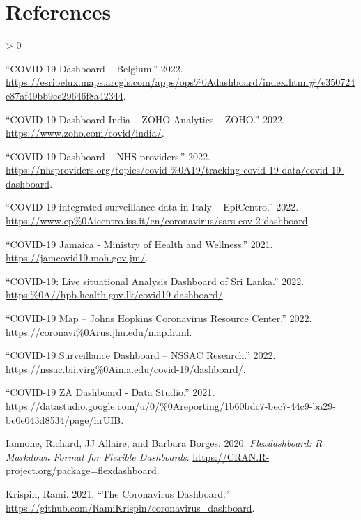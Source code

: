 \documentclass[
]{article}
\newlength{\cslhangindent}
\newenvironment{CSLReferences}[2] %
 {%
  \setlength{\parindent}{0pt}
  \ifodd #1 \everypar{\setlength{\hangindent}{\cslhangindent}}\ignorespaces\fi
  \ifnum #2 > 0
  \setlength{\parskip}{#2\baselineskip}
  \fi
 }%
 {}
\begin{document}
\hypertarget{references}{%
\section{References}\label{references}}

\hypertarget{refs}{}
\begin{CSLReferences}{1}{0}
\leavevmode\hypertarget{ref-belgium}{}%
{``{COVID 19 Dashboard -- Belgium}.''} 2022.
\url{https://esribelux.maps.arcgis.com/apps/ops\%0Adashboard/index.html\#/e350724c87af49bb9ce29646f8a42344}.

\leavevmode\hypertarget{ref-indiadash}{}%
{``{COVID 19 Dashboard India -- ZOHO Analytics -- ZOHO}.''} 2022.
\url{https://www.zoho.com/covid/india/}.

\leavevmode\hypertarget{ref-nhs}{}%
{``{COVID 19 Dashboard -- NHS providers}.''} 2022.
\url{https://nhsproviders.org/topics/covid-\%0A19/tracking-covid-19-data/covid-19-dashboard}.

\leavevmode\hypertarget{ref-italy}{}%
{``{COVID-19 integrated surveillance data in Italy -- EpiCentro}.''}
2022.
\url{https://www.ep\%0Aicentro.iss.it/en/coronavirus/sars-cov-2-dashboard}.

\leavevmode\hypertarget{ref-jamaica}{}%
{``{COVID-19 Jamaica - Ministry of Health and Wellness}.''} 2021.
\url{https://jamcovid19.moh.gov.jm/}.

\leavevmode\hypertarget{ref-sl}{}%
{``{COVID-19: Live situational Analysis Dashboard of Sri Lanka}.''}
2022. \url{https:\%0A//hpb.health.gov.lk/covid19-dashboard/}.

\leavevmode\hypertarget{ref-jh}{}%
{``{COVID-19 Map -- Johns Hopkins Coronavirus Resource Center}.''} 2022.
\url{https://coronavi\%0Arus.jhu.edu/map.html}.

\leavevmode\hypertarget{ref-nssac}{}%
{``{COVID-19 Surveillance Dashboard -- NSSAC Research}.''} 2022.
\url{https://nssac.bii.virg\%0Ainia.edu/covid-19/dashboard/}.

\leavevmode\hypertarget{ref-za}{}%
{``{COVID-19 ZA Dashboard - Data Studio}.''} 2021.
\url{https://datastudio.google.com/u/0/\%0Areporting/1b60bdc7-bec7-44c9-ba29-be0e043d8534/page/hrUIB}.

\leavevmode\hypertarget{ref-flexdashboard}{}%
Iannone, Richard, JJ Allaire, and Barbara Borges. 2020.
\emph{Flexdashboard: R Markdown Format for Flexible Dashboards}.
\url{https://CRAN.R-project.org/package=flexdashboard}.

\leavevmode\hypertarget{ref-rami}{}%
Krispin, Rami. 2021. {``{The Coronavirus Dashboard}.''}
\url{https://github.com/RamiKrispin/coronavirus_dashboard}.


\end{CSLReferences}
\end{document}

